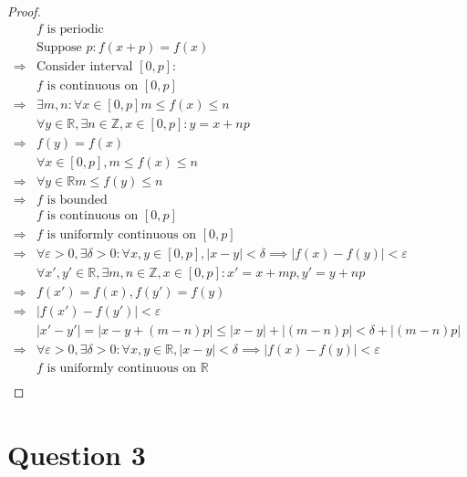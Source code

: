 \documentclass{article}
\begin{document}
\begin{proof}
    \begin{align*}
        &f\text{ is periodic}\\
        &\text{Suppose }p:f(x+p)=f(x)\\
        \Rightarrow&\text{Consider interval }[0,p]:\\
        &f\text{ is continuous on }[0,p]\\
        \Rightarrow&\exists m,n:\forall x\in [0,p]m\leqslant f(x)\leqslant n\\
        &\forall y\in \mathbb{R},\exists n\in\mathbb{Z},x\in[0,p]:y=x+np\\
        \Rightarrow&f(y)=f(x)\\
        &\forall x\in [0,p],m\leqslant f(x)\leqslant n\\
        \Rightarrow&\forall y\in \mathbb{R}m\leqslant f(y)\leqslant n\\
        \Rightarrow&f\text{ is bounded}\\
        &f\text{ is continuous on }[0,p]\\
        \Rightarrow&f\text{ is uniformly continuous on }[0,p]\\
        \Rightarrow&\forall \varepsilon >0,\exists \delta>0:\forall x,y\in [0,p],|x-y|<\delta\implies |f(x)-f(y)|<\varepsilon\\
        &\forall x',y'\in \mathbb{R},\exists m,n\in\mathbb{Z},x\in[0,p]:x'=x+mp,y'=y+np\\
        \Rightarrow&f(x')=f(x),f(y')=f(y)\\
        \Rightarrow&|f(x')-f(y')|<\varepsilon\\
        &|x'-y'|=|x-y+(m-n)p|\leqslant |x-y|+|(m-n)p|<\delta+|(m-n)p|\\
        \Rightarrow&\forall \varepsilon >0,\exists \delta>0:\forall x,y\in \mathbb{R},|x-y|<\delta\implies |f(x)-f(y)|<\varepsilon\\
        &f\text{ is uniformly continuous on }\mathbb{R}\\
    \end{align*}
\end{proof}

\newpage

\section*{Question 3}

~
\end{document}
